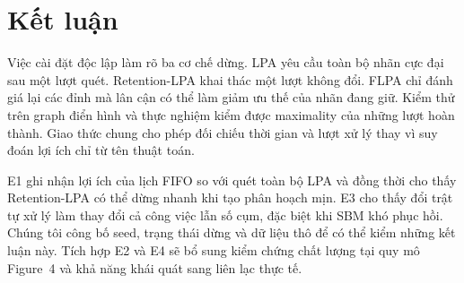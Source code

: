 \section{Kết luận}

Việc cài đặt độc lập làm rõ ba cơ chế dừng. LPA yêu cầu toàn bộ nhãn cực đại sau một lượt quét. Retention-LPA khai thác một lượt không đổi. FLPA chỉ đánh giá lại các đỉnh mà lân cận có thể làm giảm ưu thế của nhãn đang giữ. Kiểm thử trên graph điển hình và thực nghiệm kiểm được maximality của những lượt hoàn thành. Giao thức chung cho phép đối chiếu thời gian và lượt xử lý thay vì suy đoán lợi ích chỉ từ tên thuật toán.

E1 ghi nhận lợi ích của lịch FIFO so với quét toàn bộ LPA và đồng thời cho thấy Retention-LPA có thể dừng nhanh khi tạo phân hoạch mịn. E3 cho thấy đổi trật tự xử lý làm thay đổi cả công việc lẫn số cụm, đặc biệt khi SBM khó phục hồi. Chúng tôi công bố seed, trạng thái dừng và dữ liệu thô để có thể kiểm những kết luận này. Tích hợp E2 và E4 sẽ bổ sung kiểm chứng chất lượng tại quy mô Figure~4 và khả năng khái quát sang liên lạc thực tế.
